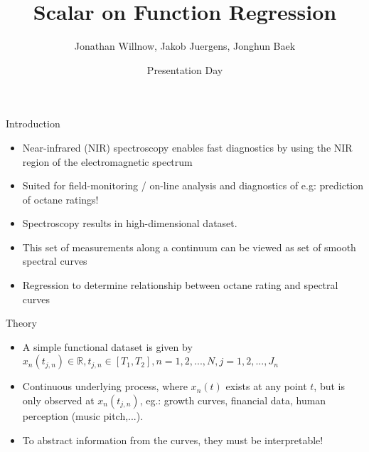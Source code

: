 \documentclass{beamer}
\title{Scalar on Function Regression}
\author{Jonathan Willnow, Jakob Juergens, Jonghun Baek}
\date{{\color{red}}Presentation Day}
\begin{document}
	
	\begin{frame}
		\titlepage 
	\end{frame}
	
	\logo{}
	
	
	\begin{frame}{Introduction}
	
		\begin{itemize}
			\item Near-infrared (NIR) spectroscopy enables fast diagnostics by using the NIR region of the electromagnetic spectrum
			\item Suited for field-monitoring / on-line analysis and diagnostics of e.g: prediction of octane ratings!
			\item Spectroscopy results in high-dimensional dataset.	

			\item
			This set of measurements along a continuum can be viewed as set of smooth spectral curves
			

			\item
			Regression to determine relationship between octane rating and spectral curves
			\end{itemize}
	\end{frame}
	
	\begin{frame}{Theory}
		

		
		\begin{itemize}
			\item
			A simple functional dataset is given by $x_{n}(t_{j,n}) \in \mathbb{R}, t_{j,n} \in [T_1, T_2], n = 1,2,...,N, j = 1,2,..., J_n  $
			\item Continuous underlying process, where $x_n(t)$ exists at any point $t$, but is only observed at $x_{n}(t_{j,n})$, eg.: growth curves, financial data, human perception (music pitch,...).
			
			\item To abstract information from the curves, they must be interpretable!
			
			\end{itemize}
	\end{frame}
\end{document}
